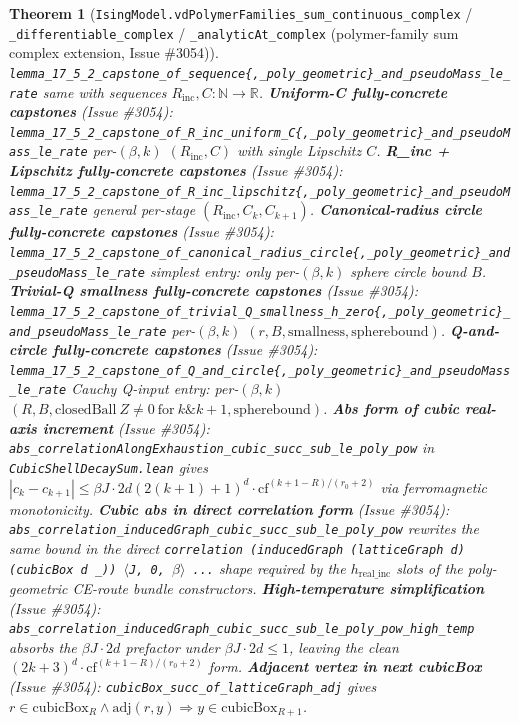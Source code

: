 \documentclass[a4paper,11pt]{article}
\newtheorem{theorem}{Theorem}
\begin{document}
\begin{theorem}[\texttt{IsingModel.vdPolymerFamilies\_sum\_continuous\_complex} /
\texttt{\_differentiable\_complex} / \texttt{\_analyticAt\_complex} (polymer-family sum
complex extension, Issue \#3054)]
\texttt{lemma\_17\_5\_2\_capstone\_of\_sequence\{,\_poly\_geometric\}\_and\_pseudoMass\_le\_rate}
same with sequences \(R_{\mathrm{inc}}, C : \mathbb{N} \to \mathbb{R}\).
\textbf{Uniform-C fully-concrete capstones} (Issue \#3054):
\texttt{lemma\_17\_5\_2\_capstone\_of\_R\_inc\_uniform\_C\{,\_poly\_geometric\}\_and\_pseudoMass\_le\_rate}
per-\((\beta, k)\) \((R_{\mathrm{inc}}, C)\) with single Lipschitz \(C\).
\textbf{R\_inc + Lipschitz fully-concrete capstones} (Issue \#3054):
\texttt{lemma\_17\_5\_2\_capstone\_of\_R\_inc\_lipschitz\{,\_poly\_geometric\}\_and\_pseudoMass\_le\_rate}
general per-stage \((R_{\mathrm{inc}}, C_k, C_{k+1})\).
\textbf{Canonical-radius circle fully-concrete capstones} (Issue \#3054):
\texttt{lemma\_17\_5\_2\_capstone\_of\_canonical\_radius\_circle\{,\_poly\_geometric\}\_and\_pseudoMass\_le\_rate}
simplest entry: only per-\((\beta, k)\) sphere circle bound \(B\).
\textbf{Trivial-Q smallness fully-concrete capstones} (Issue \#3054):
\texttt{lemma\_17\_5\_2\_capstone\_of\_trivial\_Q\_smallness\_h\_zero\{,\_poly\_geometric\}\_and\_pseudoMass\_le\_rate}
per-\((\beta, k)\) \((r, B, \mathrm{smallness}, \mathrm{sphere bound})\).
\textbf{Q-and-circle fully-concrete capstones} (Issue \#3054):
\texttt{lemma\_17\_5\_2\_capstone\_of\_Q\_and\_circle\{,\_poly\_geometric\}\_and\_pseudoMass\_le\_rate}
Cauchy Q-input entry: per-\((\beta, k)\) \((R, B, \mathrm{closedBall}~Z\neq 0~\mathrm{for}~k\&k+1, \mathrm{sphere bound})\).
\textbf{Abs form of cubic real-axis increment} (Issue \#3054):
\texttt{abs\_correlationAlongExhaustion\_cubic\_succ\_sub\_le\_poly\_pow}
in \texttt{CubicShellDecaySum.lean} gives
\(|c_k - c_{k+1}| \le \beta J \cdot 2d (2(k+1)+1)^d \cdot \mathrm{cf}^{(k+1-R)/(r_0+2)}\)
via ferromagnetic monotonicity.
\textbf{Cubic abs in direct correlation form} (Issue \#3054):
\texttt{abs\_correlation\_inducedGraph\_cubic\_succ\_sub\_le\_poly\_pow}
rewrites the same bound in the direct
\texttt{correlation (inducedGraph (latticeGraph d) (cubicBox d \_)) \(\langle\)J, 0, \(\beta\rangle\) ...}
shape required by the \(h_{\mathrm{real\_inc}}\) slots of the poly-geometric
CE-route bundle constructors.
\textbf{High-temperature simplification} (Issue \#3054):
\texttt{abs\_correlation\_inducedGraph\_cubic\_succ\_sub\_le\_poly\_pow\_high\_temp}
absorbs the \(\beta J\cdot 2d\) prefactor under \(\beta J\cdot 2d \le 1\),
leaving the clean \((2k+3)^d \cdot \mathrm{cf}^{(k+1-R)/(r_0+2)}\) form.
\textbf{Adjacent vertex in next cubicBox} (Issue \#3054):
\texttt{cubicBox\_succ\_of\_latticeGraph\_adj} gives
\(r \in \mathrm{cubicBox}_R \wedge \mathrm{adj}(r, y) \Rightarrow y \in \mathrm{cubicBox}_{R+1}\).

\end{theorem}
\end{document}
